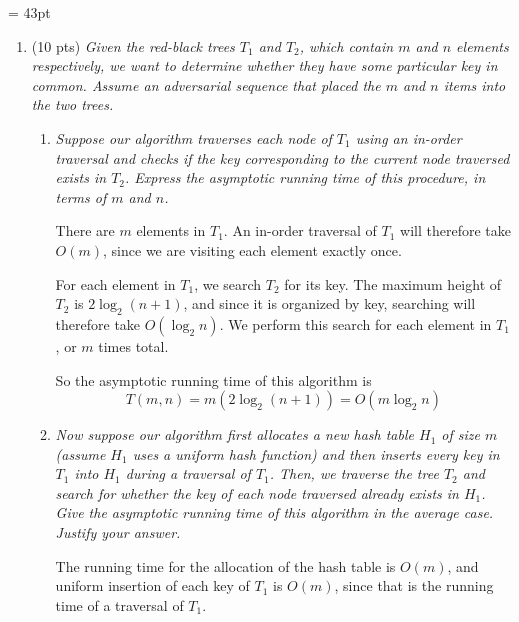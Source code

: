 \documentclass[12pt]{article}
\begin{document}
\renewcommand{\headrulewidth}{0.4pt}
\headheight = 43pt

\vspace{-3mm}

\begin{enumerate}
	\item (10 pts) \textit{Given the red-black trees $T_{1}$ and $T_{2}$, which contain $m$ and $n$ elements respectively, we want to determine whether they have some particular key in common. Assume an adversarial sequence 
that placed the $m$ and $n$ items into the two trees.}

	\begin{enumerate}

	\item \textit{Suppose our algorithm traverses each node of $T_{1}$ using an in-order traversal and checks if the key corresponding to the current node traversed exists in $T_{2}$. Express the asymptotic running time of this 
procedure, in terms of $m$ and $n$.}
	
	There are $m$ elements in $T_1$. An in-order traversal of $T_1$ will therefore take $O(m)$, since we are visiting each element exactly once.
	
	For each element in $T_1$, we search $T_2$ for its key. The maximum height of $T_2$ is $2\log_2(n+1)$, and since it is organized by key, searching will therefore take $O(\log_2 n)$. We perform this search for each element 
in $T_1$, or $m$ times total.
	
	So the asymptotic running time of this algorithm is
	\[
	\boxed{T(m,n) = m\left(2\log_2(n+1)\right) = O(m\log_2 n)}
	\]

	\item \label{q:rb:hash:b} \textit{Now suppose our algorithm first allocates a new hash table $H_{1}$ of size $m$ (assume $H_{1}$ uses a uniform hash function) and then inserts every key in $T_{1}$ into $H_{1}$ during a 
traversal of $T_{1}$. Then, we traverse the tree $T_{2}$ and search for whether the key of each node traversed already exists in $H_{1}$. Give the asymptotic running time of this algorithm in the average case. Justify your answer.}
	
	The running time for the allocation of the hash table is $O(m)$, and uniform insertion of each key of $T_1$ is $O(m)$, since that is the running time of a traversal of $T_1$.
	

\end{enumerate}
\end{enumerate}
\end{document}
